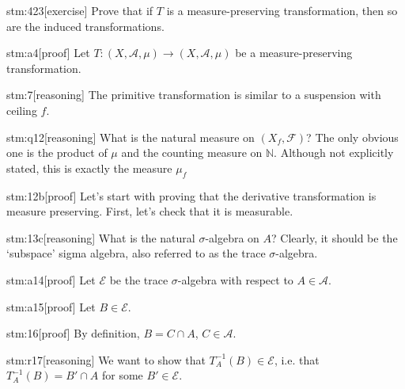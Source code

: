 
\begin{stm}{stm:423}[exercise]
Prove that if $T$ is a measure-preserving transformation, then so are the induced transformations.
\end{stm}


\begin{stm}{stm:a4}[proof]
Let $T : (X, \mathcal{A}, \mu) \to (X, \mathcal{A}, \mu)$ be a measure-preserving transformation.
\end{stm}

\begin{stm}{stm:7}[reasoning]
The primitive transformation is similar to a suspension with ceiling $f$.
\end{stm}

\begin{stm}{stm:q12}[reasoning]
What is the natural measure on $(X_f, \mathcal{F})$? The only obvious one is the product of $\mu$ and the counting measure on $\mathbb{N}$. Although not explicitly stated, this is exactly the measure $\mu_f$
\end{stm}

\begin{stm}{stm:12b}[proof]
Let's start with proving that the derivative transformation is measure preserving. First, let's check that it is measurable. 
\end{stm}

\begin{stm}{stm:13c}[reasoning]
What is the natural $\sigma$-algebra on $A$? Clearly, it should be the ‘subspace’ sigma algebra, also referred to as the trace $\sigma$-algebra.
\end{stm}

\begin{stm}{stm:a14}[proof]
Let $\mathcal{E}$ be the trace $\sigma$-algebra with respect to $A \in \mathcal{A}$.
\end{stm}

\begin{stm}{stm:a15}[proof]
Let $B \in \mathcal{E}$.
\end{stm}

\begin{stm}{stm:16}[proof]
By definition, $B = C \cap A$, $C \in \mathcal{A}$.
\end{stm}

\begin{stm}{stm:r17}[reasoning]
We want to show that $T_A^{-1}(B) \in \mathcal{E}$, i.e. that $T_A^{-1}(B) = B' \cap A$ for some $B' \in \mathcal{E}$.
\end{stm}

